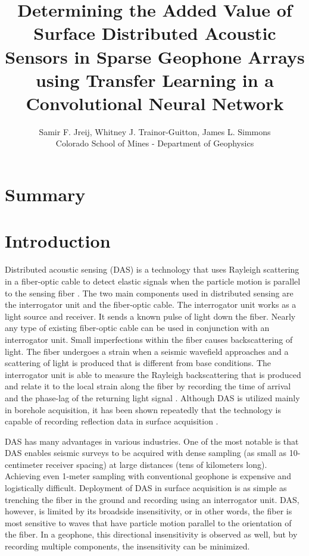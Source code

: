 

\title{Determining the Added Value of Surface Distributed Acoustic Sensors in Sparse Geophone Arrays using Transfer Learning in a Convolutional Neural Network}
\author{Samir F. Jreij, Whitney J. Trainor-Guitton, James L. Simmons \\Colorado School of Mines - Department of Geophysics}

\maketitle

\section{Summary}

\section{Introduction}
Distributed acoustic sensing (DAS) is a technology that uses Rayleigh scattering in a fiber-optic cable to detect elastic signals when the particle motion is parallel to the sensing fiber \citep{hornman2013field}. The two main components used in distributed sensing are the interrogator unit and the fiber-optic cable. The interrogator unit works as a light source and receiver. It sends a known pulse of light down the fiber. Nearly any type of existing fiber-optic cable can be used in conjunction with an interrogator unit. Small imperfections within the fiber causes backscattering of light. The fiber undergoes a strain when a seismic wavefield approaches and a scattering of light is produced that is different from base conditions. The interrogator unit is able to measure the Rayleigh backscattering that is produced and relate it to the local strain along the fiber by recording the time of arrival and the phase-lag of the returning light signal \citep{Parker2014}. Although DAS is utilized mainly in borehole acquisition, it has been shown repeatedly that the technology is capable of recording reflection data in surface acquisition \citep{daley2013field,yavuz2016subsurface,jreij2018improving}.

DAS has many advantages in various industries. One of the most notable is that DAS enables seismic surveys to be acquired with dense sampling (as small as 10-centimeter receiver spacing) at large distances (tens of kilometers long). Achieving even 1-meter sampling with conventional geophone is expensive and logistically difficult. Deployment of DAS in surface acquisition is as simple as trenching the fiber in the ground and recording using an interrogator unit. DAS, however, is limited by its broadside insensitivity, or in other words, the fiber is most sensitive to waves that have particle motion parallel to the orientation of the fiber. In a geophone, this directional insensitivity is observed as well, but by recording multiple components, the insensitivity can be minimized.  

